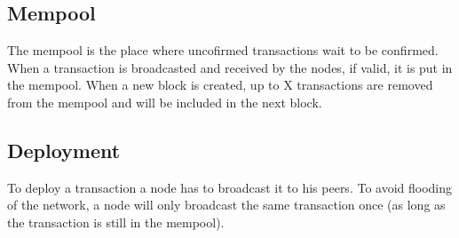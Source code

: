 \documentclass{article}
\begin{document}
\subsection{Mempool}

The mempool is the place where uncofirmed transactions
wait to be confirmed.
When a transaction is broadcasted and received by the nodes,
if valid, it is put in the mempool.
When a new block is created, up to X transactions are removed from the
mempool and will be included in the next block.

\subsection{Deployment}

To deploy a transaction a node has to broadcast it to his peers.
To avoid flooding of the network, a node will only broadcast
the same transaction once (as long as the transaction is still in the mempool).
\end{document}
